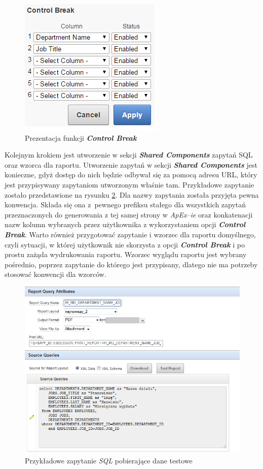 \documentclass[11pt,a4paper]{article}
\begin{document}
\begin{figure}[h]
\centering
\includegraphics[scale=0.9]{cbreak}
\caption{Prezentacja funkcji \emph{\textbf{Control Break}}}
\label{img:raport_ir_cbreak}
\end{figure}


Kolejnym krokiem jest utworzenie w sekcji \emph{\textbf{Shared Components}} zapytań SQL oraz wzorca dla raportu. Utworzenie zapytań w sekcji \emph{\textbf{Shared Components}} jest konieczne, gdyż dostęp do nich będzie odbywał się za pomocą adresu URL, który jest przypisywany zapytaniom utworzonym właśnie tam. Przykładowe zapytanie zostało przedstawione na rysunku \ref{img:query}. Dla nazwy zapytania została przyjęta pewna konwencja. Składa się ona z~pewnego prefiksu stałego dla wszystkich zapytań przeznaczonych do generowania z tej samej strony w \emph{ApEx--ie} oraz konkatenacji nazw kolumn wybranych przez użytkownika z wykorzystaniem opcji \emph{\textbf{Control Break}}. Warto również przygotować zapytanie i wzorzec dla raportu domyślnego, czyli sytuacji, w której użytkownik nie skorzysta z opcji \emph{\textbf{Control Break}} i po prostu zażąda wydrukowania raportu. Wzorzec wyglądu raportu jest wybrany pośrednio, poprzez zapytanie do którego jest przypisany, dlatego nie ma potrzeby stosować konwencji dla wzorców.

\begin{figure}
\centering
\includegraphics[scale=0.9]{query}
\caption{Przykładowe zapytanie \emph{SQL} pobierające dane testowe}
\label{img:query}
\end{figure}
\end{document}
